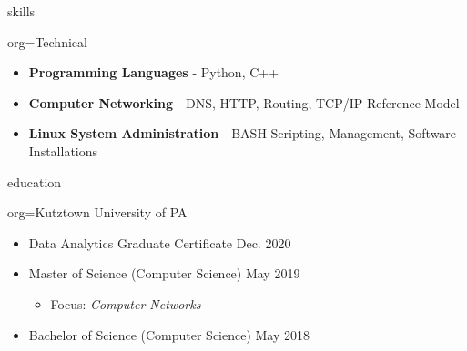 \documentclass{resume}
\begin{document}
\begin{ResumeSection}{skills}
    \newcommand{\skill}[2]{\textbf{#1} - #2}
    \begin{ResumeSubsection}{org=Technical}
        \begin{itemize}
            \item \skill{Programming Languages}{Python, C++}
            \item \skill{Computer Networking}{DNS, HTTP, Routing, TCP/IP Reference Model}
            \item \skill{Linux System Administration}{BASH Scripting, Management, Software Installations}
        \end{itemize}
    \end{ResumeSubsection}
\end{ResumeSection}

\begin{ResumeSection}{education}
    \begin{ResumeSubsection}{org={Kutztown University of PA}}
        \begin{itemize}
            \item Data Analytics Graduate Certificate \hfill Dec. 2020
            \item Master of Science (Computer Science) \hfill May 2019
            \begin{itemize}
                \item Focus: \emph{Computer Networks}
            \end{itemize}
            \item Bachelor of Science (Computer Science) \hfill May 2018
        \end{itemize}
    \end{ResumeSubsection}
\end{ResumeSection}
\end{document}

